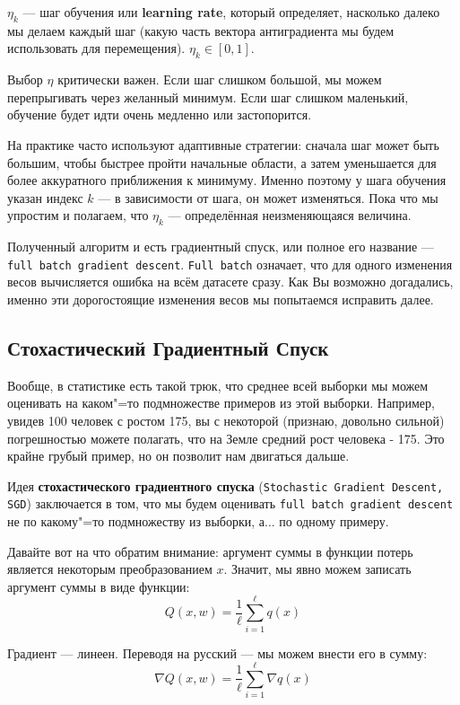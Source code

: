 $\eta_k$ --- шаг обучения или \textbf{learning rate}, который определяет, насколько далеко мы делаем каждый шаг (какую часть вектора антиградиента мы будем использовать для перемещения). $\eta_k \in [0, 1]$.

Выбор $\eta$ критически важен. Если шаг слишком большой, мы можем перепрыгивать через желанный минимум. Если шаг слишком маленький, обучение будет идти очень медленно или застопорится. 

На практике часто используют адаптивные стратегии: сначала шаг может быть большим, чтобы быстрее пройти начальные области, а затем уменьшается для более аккуратного приближения к минимуму. Именно поэтому у шага обучения указан индекс $k$ --- в зависимости от шага, он может изменяться.
Пока что мы упростим и полагаем, что $\eta_k$ --- определённая неизменяющаяся величина.

Полученный алгоритм и есть градиентный спуск, или полное его название --- \texttt{full batch gradient descent}. \texttt{Full batch} означает, что для одного изменения весов вычисляется ошибка на всём датасете сразу. Как Вы возможно догадались, именно эти дорогостоящие изменения весов мы попытаемся исправить далее.

\newpage
\subsection* {Стохастический Градиентный Спуск}

Вообще, в статистике есть такой трюк, что среднее всей выборки мы можем оценивать на каком"=то 
подмножестве примеров из этой выборки. Например, увидев 100 человек с ростом 175, вы с некоторой (признаю, довольно сильной) погрешностью можете полагать, что на Земле средний рост человека - 175. Это крайне грубый пример, но он позволит нам двигаться  дальше.

Идея \textbf{стохастического градиентного спуска} (\texttt{Stochastic Gradient Descent, SGD}) заключается в том, что мы будем оценивать 
\texttt {full batch gradient descent} 
не по какому"=то подмножеству из выборки, а... по одному примеру.

Давайте вот на что обратим внимание: аргумент суммы в функции потерь является некоторым преобразованием $x$. Значит, мы явно можем записать аргумент суммы в виде функции:
$$
Q(x, w) = \frac{1}{\ell}\sum_{i=1}^\ell q(x)
$$

Градиент --- линеен. Переводя на русский --- мы можем внести его в сумму:
$$
\nabla Q(x, w) = \frac{1}{\ell}\sum_{i=1}^\ell \nabla q(x)
$$

